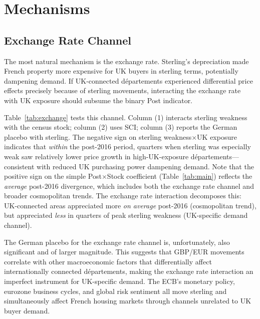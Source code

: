 \documentclass[12pt]{article}
\begin{document}
{\footnotesize}


\section{Mechanisms}\label{sec:mechanisms}

\subsection{Exchange Rate Channel}

The most natural mechanism is the exchange rate. Sterling's depreciation made French property more expensive for UK buyers in sterling terms, potentially dampening demand. If UK-connected d\'epartements experienced differential price effects precisely because of sterling movements, interacting the exchange rate with UK exposure should subsume the binary Post indicator.

Table~\ref{tab:exchange} tests this channel. Column (1) interacts sterling weakness with the census stock; column (2) uses SCI; column (3) reports the German placebo with sterling. The negative sign on sterling weakness$\times$UK exposure indicates that \textit{within} the post-2016 period, quarters when sterling was especially weak saw relatively lower price growth in high-UK-exposure d\'epartements---consistent with reduced UK purchasing power dampening demand. Note that the positive sign on the simple Post$\times$Stock coefficient (Table~\ref{tab:main}) reflects the \textit{average} post-2016 divergence, which includes both the exchange rate channel and broader cosmopolitan trends. The exchange rate interaction decomposes this: UK-connected areas appreciated more \textit{on average} post-2016 (cosmopolitan trend), but appreciated \textit{less} in quarters of peak sterling weakness (UK-specific demand channel).

The German placebo for the exchange rate channel is, unfortunately, also significant and of larger magnitude. This suggests that GBP/EUR movements correlate with other macroeconomic factors that differentially affect internationally connected d\'epartements, making the exchange rate interaction an imperfect instrument for UK-specific demand. The ECB's monetary policy, eurozone business cycles, and global risk sentiment all move sterling and simultaneously affect French housing markets through channels unrelated to UK buyer demand.
\end{document}

